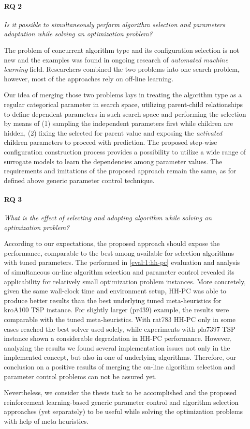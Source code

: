 \paragraph{RQ 2} \emph{Is it possible to simultaneously perform algorithm selection and parameters adaptation while solving an optimization problem?}
	
The problem of concurrent algorithm type and its configuration selection is not new and the examples was found in ongoing research of \emph{automated machine learning} field. Researchers combined the two problems into one search problem, however, most of the approaches rely on off-line learning. 
	
Our idea of merging those two problems lays in treating the algorithm type as a regular categorical parameter in search space, utilizing parent-child relationships to define dependent parameters in such search space and performing the selection by means of (1) sampling the independent parameters first while children are hidden, (2) fixing the selected for parent value and exposing the \emph{activated} children parameters to proceed with prediction. The proposed step-wise configuration construction process provides a possibility to utilize a wide range of surrogate models to learn the dependencies among parameter values. The requirements and imitations of the proposed approach remain the same, as for defined above generic parameter control technique.
	
\paragraph{RQ 3} \emph{What is the effect of selecting and adapting algorithm while solving an optimization problem?}

According to our expectations, the proposed approach should expose the performance, comparable to the best among available for selection algorithms with tuned parameters. The performed in \cref{eval:1:hh-pc} evaluation and analysis of simultaneous on-line algorithm selection and parameter control revealed its applicability for relatively small optimization problem instances. More concretely, given the same wall-clock time and environment setup, HH-PC was able to produce better results than the best underlying tuned meta-heuristics for kroA100 TSP instance. For slightly larger (pr439) example, the results were comparable with the tuned meta-heuristics. With rat783 HH-PC only in some cases reached the best solver used solely, while experiments with pla7397 TSP instance shown a considerable degradation in HH-PC performance. However, analyzing the results we found several implementation issues not only in the implemented concept, but also in one of underlying algorithms. Therefore, our conclusion on a positive results of merging the on-line algorithm selection and parameter control problems can not be assured yet.

Nevertheless, we consider the thesis task to be accomplished and the proposed reinforcement learning-based generic parameter control and algorithm selection approaches (yet separately) to be useful while solving the optimization problems with help of meta-heuristics.